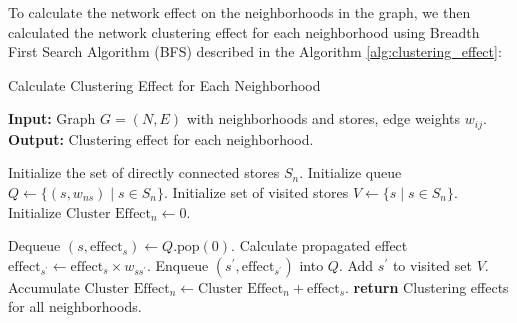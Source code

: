 \documentclass[11pt]{article}
\begin{document}
To calculate the network effect on the neighborhoods in the graph, we then calculated the network clustering effect for each neighborhood using Breadth First Search Algorithm (BFS) described in the Algorithm \ref{alg:clustering_effect}:

\begin{algorithm}[H]
  \caption{Calculate Clustering Effect for Each Neighborhood}
  \label{alg:clustering_effect}
  \begin{algorithmic}[1]
    \STATE \textbf{Input:} Graph $G = (N, E)$ with neighborhoods and stores, edge weights $w_{ij}$.
    \STATE \textbf{Output:} Clustering effect for each neighborhood.

      \STATE Initialize the set of directly connected stores $S_n$.
      \STATE Initialize queue $Q \leftarrow \{(s, w_{ns}) \mid s \in S_n\}$.
      \STATE Initialize set of visited stores $V \leftarrow \{s \mid s \in S_n\}$.
      \STATE Initialize $\text{Cluster Effect}_n \leftarrow 0$.

        \STATE Dequeue $(s, \text{effect}_s) \leftarrow Q.\text{pop}(0)$.
          \STATE Calculate propagated effect $\text{effect}_{s^\prime} \leftarrow \text{effect}_s \times w_{ss^\prime}$.
                \STATE Enqueue $(s^\prime, \text{effect}_{s^\prime})$ into $Q$.
                \STATE Add $s^\prime$ to visited set $V$.
            \ENDIF
        \ENDFOR
        \STATE Accumulate $\text{Cluster Effect}_n \leftarrow \text{Cluster Effect}_n + \text{effect}_s$.
      \ENDWHILE
    \ENDFOR
    \STATE \textbf{return} Clustering effects for all neighborhoods.
  \end{algorithmic}
\end{algorithm}
\end{document}
